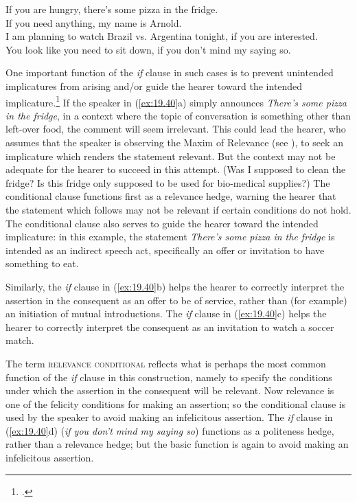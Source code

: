 \ea \label{ex:19.40}
\ea  If you are hungry, there’s some pizza in the fridge.\\
\ex If you need anything, my name is Arnold.\\
\ex I am planning to watch Brazil vs. Argentina tonight, if you are interested.\\
\ex You look like you need to sit down, if you don’t mind my saying so.
                       \z
\z


One important function of the \textit{if} clause in such cases is to prevent unintended implicatures from arising and/or guide the hearer toward the intended implicature.\footnote{\citet{DeRoseGrandy1999,Franke2007}.} If the speaker in (\ref{ex:19.40}a) simply announces \textit{There’s some pizza in the fridge}, in a context where the topic of conversation is something other than left-over food, the comment will seem irrelevant. This could lead the hearer, who assumes that the speaker is observing the Maxim of Relevance (see ), to seek an implicature which renders the statement relevant. But the context may not be adequate for the hearer to succeed in this attempt. (Was I supposed to clean the fridge? Is this fridge only supposed to be used for bio-medical supplies?) The conditional clause functions first as a relevance hedge, warning the hearer that the statement which follows may not be relevant if certain conditions do not hold. The conditional clause also serves to guide the hearer toward the intended implicature: in this example, the statement \textit{There’s some pizza in the fridge} is intended as an indirect speech act, specifically an offer or invitation to have something to eat.



Similarly, the \textit{if} clause in (\ref{ex:19.40}b) helps the hearer to correctly interpret the assertion in the consequent as an offer to be of service, rather than (for example) an initiation of mutual introductions. The \textit{if} clause in (\ref{ex:19.40}c) helps the hearer to correctly interpret the consequent as an invitation to watch a soccer match.



The term \textsc{relevance conditional} reflects what is perhaps the most common function of the \textit{if} clause in this construction, namely to specify the conditions under which the assertion in the consequent will be relevant. Now relevance is one of the felicity conditions for making an assertion; so the conditional clause is used by the speaker to avoid making an infelicitous assertion. The \textit{if} clause in (\ref{ex:19.40}d) (\textit{if you don’t mind my saying so}) functions as a politeness hedge, rather than a relevance hedge; but the basic function is again to avoid making an infelicitous assertion.



